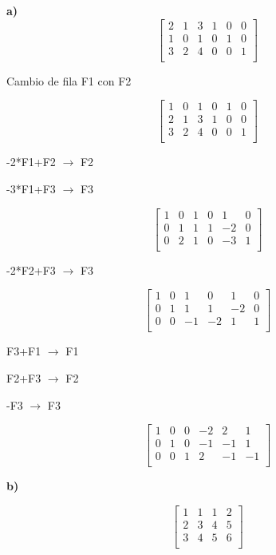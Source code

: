 \documentclass[12pt]{article}
\begin{document}
\textbf{a)}
\[
\begin{bmatrix}
2 & 1 & 3 & 1& 0& 0\\
1 & 0 & 1 & 0& 1& 0\\
3 & 2 & 4 & 0& 0& 1\\
\end{bmatrix}
\]

Cambio de fila F1 con F2

\[
\begin{bmatrix}
1 & 0 & 1 & 0& 1& 0\\
2 & 1 & 3 & 1& 0& 0\\
3 & 2 & 4 & 0& 0& 1\\
\end{bmatrix}
\]


-2*F1+F2 $\longrightarrow $ F2

-3*F1+F3 $\longrightarrow $ F3

\[
\begin{bmatrix}
1 & 0 & 1 & 0& 1& 0\\
0 & 1 & 1 & 1& -2& 0\\
0 & 2 & 1 & 0& -3& 1\\
\end{bmatrix}
\]

-2*F2+F3 $\longrightarrow $ F3

\[
\begin{bmatrix}
1 & 0 & 1 & 0& 1& 0\\
0 & 1 & 1 & 1& -2& 0\\
0 & 0 & -1 & -2& 1& 1\\
\end{bmatrix}
\]

F3+F1 $\longrightarrow $ F1

F2+F3 $\longrightarrow $ F2

-F3 $\longrightarrow $ F3

\[
\begin{bmatrix}
1 & 0 & 0& -2& 2& 1\\
0 & 1 &  0& -1& -1& 1\\
0 & 0 & 1 & 2& -1& -1\\
\end{bmatrix}
\]


\textbf{b)}

\[
\begin{bmatrix}
1 & 1 & 1& 2\\
2 & 3 & 4& 5\\
3 & 4 & 5& 6\\
\end{bmatrix}
\]
\end{document}
